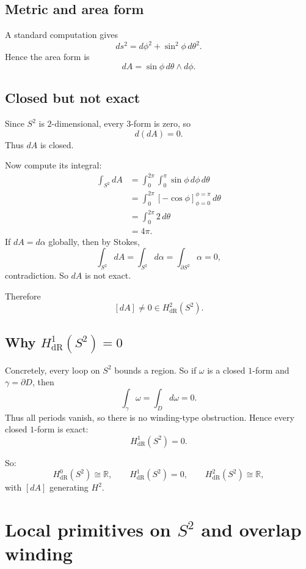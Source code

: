 \documentclass[11pt]{article}
\begin{document}
	\subsection{Metric and area form}
	
	A standard computation gives
	\[
	ds^2=d\phi^2+\sin^2\phi\,d\theta^2.
	\]
	Hence the area form is
	\[
	dA=\sin\phi\,d\theta\wedge d\phi.
	\]
	
	\subsection{Closed but not exact}
	
	Since \(S^2\) is \(2\)-dimensional, every \(3\)-form is zero, so
	\[
	d(dA)=0.
	\]
	Thus \(dA\) is closed.
	
	Now compute its integral:
	\begin{align*}
		\int_{S^2} dA
		&=
		\int_0^{2\pi}\int_0^\pi \sin\phi\,d\phi\,d\theta\\
		&=
		\int_0^{2\pi}\left[-\cos\phi\right]_{\phi=0}^{\phi=\pi}\,d\theta\\
		&=
		\int_0^{2\pi}2\,d\theta\\
		&=4\pi.
	\end{align*}
	If \(dA=d\alpha\) globally, then by Stokes,
	\[
	\int_{S^2}dA=\int_{S^2}d\alpha=\int_{\partial S^2}\alpha=0,
	\]
	contradiction. So \(dA\) is not exact.
	
	Therefore
	\[
	[dA]\neq 0\in H^2_{\mathrm{dR}}(S^2).
	\]
	
	\subsection{Why \(H^1_{\mathrm{dR}}(S^2)=0\)}
	
	Concretely, every loop on \(S^2\) bounds a region. So if \(\omega\) is a closed \(1\)-form and \(\gamma=\partial D\), then
	\[
	\int_\gamma \omega=\int_D d\omega=0.
	\]
	Thus all periods vanish, so there is no winding-type obstruction. Hence every closed \(1\)-form is exact:
	\[
	H^1_{\mathrm{dR}}(S^2)=0.
	\]
	
	So:
	\[
	H^0_{\mathrm{dR}}(S^2)\cong \mathbb{R},
	\qquad
	H^1_{\mathrm{dR}}(S^2)=0,
	\qquad
	H^2_{\mathrm{dR}}(S^2)\cong \mathbb{R},
	\]
	with \([dA]\) generating \(H^2\).
	
	\section{Local primitives on \(S^2\) and overlap winding}
	
\end{document}
